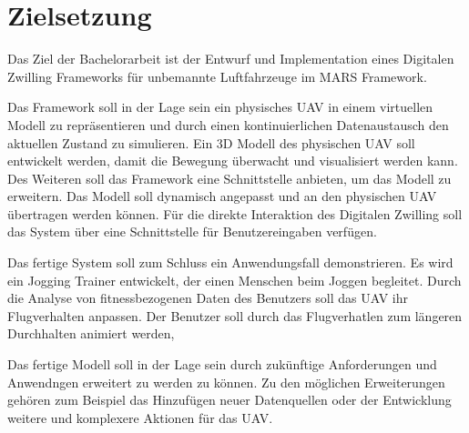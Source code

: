 \section{Zielsetzung}


Das Ziel der Bachelorarbeit ist der Entwurf und Implementation eines Digitalen Zwilling Frameworks für unbemannte Luftfahrzeuge im MARS Framework.

Das Framework soll in der Lage sein ein physisches UAV in einem virtuellen Modell zu repräsentieren und durch einen kontinuierlichen Datenaustausch den aktuellen Zustand zu simulieren. Ein 3D Modell des physischen UAV soll entwickelt werden, damit die Bewegung überwacht und visualisiert werden kann. Des Weiteren soll das Framework eine Schnittstelle anbieten, um das Modell zu erweitern. Das Modell soll dynamisch angepasst und an den physischen UAV übertragen werden können. Für die direkte Interaktion des Digitalen Zwilling soll das System über eine Schnittstelle für Benutzereingaben verfügen.

Das fertige System soll zum Schluss ein Anwendungsfall demonstrieren. Es wird ein Jogging Trainer entwickelt, der einen Menschen beim Joggen begleitet. Durch die Analyse von fitnessbezogenen Daten des Benutzers soll das UAV ihr Flugverhalten anpassen. Der Benutzer soll durch das Flugverhatlen zum längeren Durchhalten animiert werden, 

Das fertige Modell soll in der Lage sein durch zukünftige Anforderungen und Anwendngen erweitert zu werden zu können. Zu den möglichen Erweiterungen gehören zum Beispiel das Hinzufügen neuer Datenquellen oder der Entwicklung weitere und komplexere Aktionen für das UAV.
